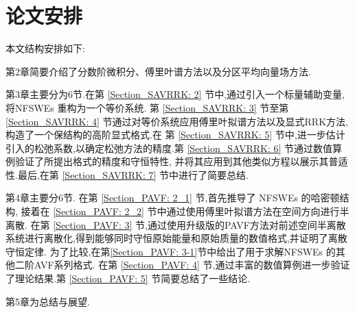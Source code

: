 \section{论文安排}
本文结构安排如下:

第2章简要介绍了分数阶微积分、傅里叶谱方法以及分区平均向量场方法.

第3章主要分为6节.在第 \ref{Section_SAVRRK: 2} 节中,通过引入一个标量辅助变量,将NFSWEs  重构为一个等价系统.
第 \ref{Section_SAVRRK: 3} 节至第 \ref{Section_SAVRRK: 4} 节通过对等价系统应用傅里叶拟谱方法以及显式RRK方法,构造了一个保结构的高阶显式格式.在
第 \ref{Section_SAVRRK: 5} 节中,进一步估计引入的松弛系数,以确定松弛方法的精度.第 \ref{Section_SAVRRK: 6} 节通过数值算例验证了所提出格式的精度和守恒特性,
并将其应用到其他类似方程以展示其普适性.最后,在第 \ref{Section_SAVRRK: 7} 节中进行了简要总结.

第4章主要分6节. 在第 \ref{Section_PAVF: 2_1} 节,首先推导了 NFSWEs 的哈密顿结构, 接着在 \ref{Section_PAVF: 2_2} 节中通过使用傅里叶拟谱方法在空间方向进行半离散.
在第 \ref{Section_PAVF: 3} 节,通过使用升级版的PAVF方法对前述空间半离散系统进行离散化,得到能够同时守恒原始能量和原始质量的数值格式,并证明了离散守恒定律.
为了比较,在第\ref{Section_PAVF: 3-1}节中给出了用于求解NFSWEs  的其他二阶AVF系列格式.
在第 \ref{Section_PAVF: 4} 节,通过丰富的数值算例进一步验证了理论结果.第 \ref{Section_PAVF: 5} 节简要总结了一些结论.

第5章为总结与展望.